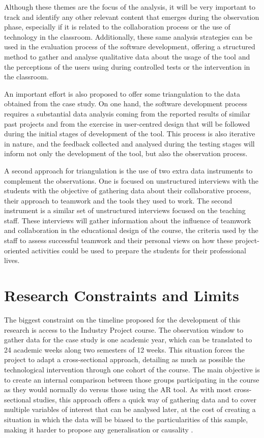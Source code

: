 Although these themes are the focus of the analysis, it will be very important to track and identify any other relevant content that emerges during the observation phase, especially if
it is related to the collaboration process or the use of technology in the classroom. Additionally, these same analysis strategies can be used in the evaluation process of the software
development, offering a structured method to gather and analyse qualitative data about the usage of the tool and the perceptions of the users using during controlled tests or the intervention
in the classroom.

An important effort is also proposed to offer some triangulation to the data obtained from the case study. On one hand, the software development process requires a substantial data analysis
coming from the reported results of similar past projects and from the exercise in user-centred design that will be followed during the initial stages of development of the tool. This process
is also iterative in nature, and the feedback collected and analysed during the testing stages will inform not only the development of the tool, but also the observation process.

A second approach for triangulation is the use of two extra data instruments to complement the observations. One is focused on unstructured interviews with the students with the objective of
gathering data about their collaborative process, their approach to teamwork and the tools they used to work. The second instrument is a similar set of unstructured interviews focused on the
teaching staff. These interviews will gather information about the influence of teamwork and collaboration in the educational design of the course, the criteria used by the staff to assess
successful teamwork and their personal views on how these project-oriented activities could be used to prepare the students for their professional lives.

\section{Research Constraints and Limits \label{sec:3-2}}

The biggest constraint on the timeline proposed for the development of this research is access to the Industry Project course. The observation window to gather data for the
case study is one academic year, which can be translated to 24 academic weeks along two semesters of 12 weeks. This situation forces the project to adapt a cross-sectional
approach, detailing as much as possible the technological intervention through one cohort of the course. The main objective is to create an internal comparison between those groups
participating in the course as they would normally do versus those using the \ac{AR} tool. As with most cross-sectional studies, this approach offers a quick way of gathering data and to
cover multiple variables of interest that can be analysed later, at the cost of creating a situation in which the data will be biased to the particularities of this sample, making
it harder to propose any generalisation or causality \parencite{wang_2020}.

